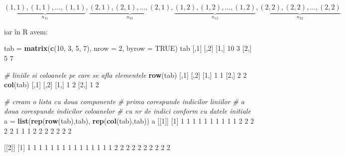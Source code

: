 \documentclass[]{article}
\newenvironment{Shaded}{\begin{snugshade}}{\end{snugshade}}
\newcommand{\KeywordTok}[1]{\textcolor[rgb]{0.13,0.29,0.53}{\textbf{#1}}}
\newcommand{\DataTypeTok}[1]{\textcolor[rgb]{0.13,0.29,0.53}{#1}}
\newcommand{\DecValTok}[1]{\textcolor[rgb]{0.00,0.00,0.81}{#1}}
\newcommand{\StringTok}[1]{\textcolor[rgb]{0.31,0.60,0.02}{#1}}
\newcommand{\CommentTok}[1]{\textcolor[rgb]{0.56,0.35,0.01}{\textit{#1}}}
\newcommand{\OtherTok}[1]{\textcolor[rgb]{0.56,0.35,0.01}{#1}}
\newcommand{\NormalTok}[1]{#1}
\begin{document}
\[
  \underbrace{(1,1), (1,1), \ldots, (1,1)}_{n_{11}},\underbrace{(2,1), (2,1), \ldots, (2,1)}_{n_{21}},\underbrace{(1,2), (1,2), \ldots, (1,2)}_{n_{12}},\underbrace{(2,2), (2,2), \ldots, (2,2)}_{n_{22}}
\]

iar în R avem:

\begin{Shaded}
\begin{Highlighting}[]
\NormalTok{tab =}\StringTok{ }\KeywordTok{matrix}\NormalTok{(}\KeywordTok{c}\NormalTok{(}\DecValTok{10}\NormalTok{, }\DecValTok{3}\NormalTok{, }\DecValTok{5}\NormalTok{, }\DecValTok{7}\NormalTok{), }\DataTypeTok{nrow =} \DecValTok{2}\NormalTok{, }\DataTypeTok{byrow =} \OtherTok{TRUE}\NormalTok{)}
\NormalTok{tab}
\NormalTok{     [,}\DecValTok{1}\NormalTok{] [,}\DecValTok{2}\NormalTok{]}
\NormalTok{[}\DecValTok{1}\NormalTok{,]   }\DecValTok{10}    \DecValTok{3}
\NormalTok{[}\DecValTok{2}\NormalTok{,]    }\DecValTok{5}    \DecValTok{7}

\CommentTok{# liniile si coloanele pe care se afla elementele}
\KeywordTok{row}\NormalTok{(tab)}
\NormalTok{     [,}\DecValTok{1}\NormalTok{] [,}\DecValTok{2}\NormalTok{]}
\NormalTok{[}\DecValTok{1}\NormalTok{,]    }\DecValTok{1}    \DecValTok{1}
\NormalTok{[}\DecValTok{2}\NormalTok{,]    }\DecValTok{2}    \DecValTok{2}
\KeywordTok{col}\NormalTok{(tab)}
\NormalTok{     [,}\DecValTok{1}\NormalTok{] [,}\DecValTok{2}\NormalTok{]}
\NormalTok{[}\DecValTok{1}\NormalTok{,]    }\DecValTok{1}    \DecValTok{2}
\NormalTok{[}\DecValTok{2}\NormalTok{,]    }\DecValTok{1}    \DecValTok{2}

\CommentTok{# cream o lista cu doua componente}
\CommentTok{# prima corespunde indicilor liniilor}
\CommentTok{# a doua corespunde indicilor coloanelor}
\CommentTok{# cu nr de indici conform cu datele initiale}
\NormalTok{a =}\StringTok{ }\KeywordTok{list}\NormalTok{(}\KeywordTok{rep}\NormalTok{(}\KeywordTok{row}\NormalTok{(tab),tab), }\KeywordTok{rep}\NormalTok{(}\KeywordTok{col}\NormalTok{(tab),tab))}
\NormalTok{a}
\NormalTok{[[}\DecValTok{1}\NormalTok{]]}
\NormalTok{ [}\DecValTok{1}\NormalTok{] }\DecValTok{1} \DecValTok{1} \DecValTok{1} \DecValTok{1} \DecValTok{1} \DecValTok{1} \DecValTok{1} \DecValTok{1} \DecValTok{1} \DecValTok{1} \DecValTok{2} \DecValTok{2} \DecValTok{2} \DecValTok{2} \DecValTok{2} \DecValTok{1} \DecValTok{1} \DecValTok{1} \DecValTok{2} \DecValTok{2} \DecValTok{2} \DecValTok{2} \DecValTok{2} \DecValTok{2} \DecValTok{2}

\NormalTok{[[}\DecValTok{2}\NormalTok{]]}
\NormalTok{ [}\DecValTok{1}\NormalTok{] }\DecValTok{1} \DecValTok{1} \DecValTok{1} \DecValTok{1} \DecValTok{1} \DecValTok{1} \DecValTok{1} \DecValTok{1} \DecValTok{1} \DecValTok{1} \DecValTok{1} \DecValTok{1} \DecValTok{1} \DecValTok{1} \DecValTok{1} \DecValTok{2} \DecValTok{2} \DecValTok{2} \DecValTok{2} \DecValTok{2} \DecValTok{2} \DecValTok{2} \DecValTok{2} \DecValTok{2} \DecValTok{2}
\end{Highlighting}
\end{Shaded}
\end{document}
